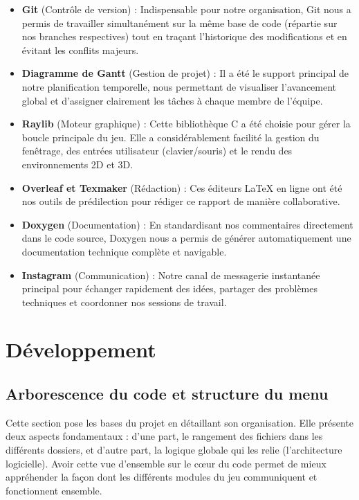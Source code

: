 \documentclass[a4paper,11pt]{article}
\begin{document}
\begin{itemize}
    \item \textbf{Git} (Contrôle de version) : Indispensable pour notre organisation, Git nous a permis de travailler simultanément sur la même base de code (répartie sur nos branches respectives) tout en traçant l'historique des modifications et en évitant les conflits majeurs.
    \item \textbf{Diagramme de Gantt} (Gestion de projet) : Il a été le support principal de notre planification temporelle, nous permettant de visualiser l'avancement global et d'assigner clairement les tâches à chaque membre de l'équipe.
    \item \textbf{Raylib} (Moteur graphique) : Cette bibliothèque C a été choisie pour gérer la boucle principale du jeu. Elle a considérablement facilité la gestion du fenêtrage, des entrées utilisateur (clavier/souris) et le rendu des environnements 2D et 3D.
    \item \textbf{Overleaf et Texmaker} (Rédaction) : Ces éditeurs LaTeX en ligne ont été nos outils de prédilection pour rédiger ce rapport de manière collaborative.
    \item \textbf{Doxygen} (Documentation) : En standardisant nos commentaires directement dans le code source, Doxygen nous a permis de générer automatiquement une documentation technique complète et navigable.
    \item \textbf{Instagram} (Communication) : Notre canal de messagerie instantanée principal pour échanger rapidement des idées, partager des problèmes techniques et coordonner nos sessions de travail.
\end{itemize}


\section{Développement}


\subsection{Arborescence du code et structure du menu}\label{Logique du jeu}
\hspace*{1.5em}
Cette section pose les bases du projet en détaillant son organisation. Elle présente deux aspects fondamentaux : d'une part, le rangement des fichiers dans les différents dossiers, et d'autre part, la logique globale qui les relie (l'architecture logicielle). Avoir cette vue d'ensemble sur le cœur du code permet de mieux appréhender la façon dont les différents modules du jeu communiquent et fonctionnent ensemble.
\end{document}
